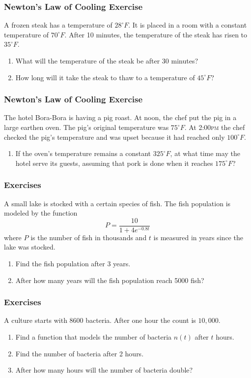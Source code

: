 \documentclass[xcolor=dvipsnames]{beamer}
\begin{document}
\begin{frame}
  \frametitle{Newton's Law of Cooling Exercise}
{\ubung} A frozen steak has a temperature of $28^{\circ}F$. It is placed in a
room with a constant temperature of $70^{\circ}F$. After 10 minutes,
the temperature of the steak has risen to $35^{\circ}F$. 
\begin{enumerate}
\item<1-> What will the temperature of the steak be after 30 minutes?
\item<2-> How long will it take the steak to thaw to a temperature of $45^{\circ}F$?
\end{enumerate}
\end{frame}

\begin{frame}
  \frametitle{Newton's Law of Cooling Exercise}
{\ubung} The hotel Bora-Bora is having a pig roast. At noon, the chef put the
pig in a large earthen oven. The pig's original temperature was
$75^{\circ}F$. At 2:00\textsc{pm} the chef checked the pig's
temperature and was upset because it had reached only $100^{\circ}F$.
\begin{enumerate}
\item If the oven's temperature remains a constant $325^{\circ}F$, at
  what time may the hotel serve its guests, assuming that pork is done
  when it reaches $175^{\circ}F$?
\end{enumerate}
\end{frame}

\begin{frame}
  \frametitle{Exercises}
{\ubung}  A small lake is stocked with a certain species of fish. The fish
  population is modeled by the function
  \begin{equation}
    \label{eq:peongeex}
    P=\frac{10}{1+4e^{-0.8t}}
  \end{equation}
where $P$ is the number of fish in thousands and $t$ is measured in
years since the lake was stocked.
\begin{enumerate}
\item Find the fish population after 3 years.
\item After how many years will the fish population reach 5000 fish?
\end{enumerate}
\end{frame}

\begin{frame}
  \frametitle{Exercises}
  {\ubung} A culture starts with 8600 bacteria. After one hour the
  count is $10,000$.
\begin{enumerate}
\item Find a function that models the number of bacteria $n(t)$ after $t$ hours.
\item Find the number of bacteria after 2 hours.
\item After how many hours will the number of bacteria double?
\end{enumerate}
\end{frame}
\end{document}

